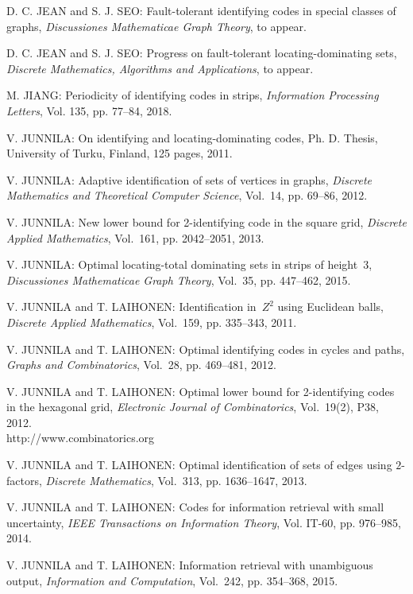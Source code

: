 \begin{thebibliography}{999}
D. C. JEAN and S. J. SEO: Fault-tolerant identifying codes in special classes of graphs, {\it Discussiones Mathematicae Graph Theory}, to appear.

D. C. JEAN and S. J. SEO: Progress on fault-tolerant locating-dominating sets, {\it Discrete Mathematics, Algorithms and Applications}, to appear.

M. JIANG: Periodicity of identifying codes in strips, {\it Information Processing Letters}, Vol. 135, pp. 77--84, 2018. 

V. JUNNILA: On identifying and locating-dominating codes, Ph. D. Thesis, University of Turku, Finland, 125 pages, 2011.

V. JUNNILA: Adaptive identification of sets of vertices in graphs, {\it Discrete Mathematics and Theoretical Computer Science}, Vol.~14, pp. 69--86, 2012.

V. JUNNILA: New lower bound for 2-identifying code in the square grid, {\it Discrete Applied Mathematics}, Vol.~161, pp. 2042--2051, 2013.

V. JUNNILA: Optimal locating-total dominating sets in strips of height~3, {\it Discussiones Mathematicae Graph Theory}, Vol.~35, pp. 447--462, 2015. 

V. JUNNILA and T. LAIHONEN: Identification in~$Z^2$ using Euclidean balls, {\it Discrete Applied Mathematics}, Vol.~159, pp. 335--343, 2011.
  
V. JUNNILA and T. LAIHONEN: Optimal identifying codes in cycles and paths, {\it Graphs and Combinatorics}, Vol.~28, pp. 469--481, 2012.

V. JUNNILA and T. LAIHONEN: Optimal lower bound for 2-identifying codes in the hexagonal grid, {\it Electronic Journal of Combinatorics}, Vol.~19(2), P38, 2012.\\
http://www.combinatorics.org

V. JUNNILA and T. LAIHONEN: Optimal identification of sets of edges using $2$-factors, {\it Discrete Mathematics}, Vol.~313, pp. 1636--1647, 2013.

V. JUNNILA and T. LAIHONEN: Codes for information retrieval with small uncertainty, {\it IEEE Transactions on Information Theory}, Vol. IT-60, pp. 976--985, 2014.

  V. JUNNILA and T. LAIHONEN: Information retrieval with unambiguous output, {\it Information and Computation}, Vol.~242, pp. 354--368, 2015.


\end{thebibliography}
